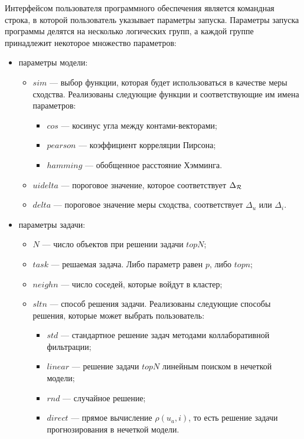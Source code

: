 Интерфейсом пользователя программного обеспечения является командная
строка, в которой пользователь указывает параметры запуска.
Параметры запуска программы делятся на несколько логических групп,
а каждой группе принадлежит некоторое множество параметров:

\begin{itemize}
	\item параметры модели:
	\begin{itemize}
		\item $sim$ --- выбор функции, которая будет использоваться в качестве
			меры сходства. Реализованы следующие функции и соответствующие им
			имена параметров:
			\begin{itemize}
				\item $cos$ --- косинус угла между контами-векторами;
				\item $pearson$ --- коэффициент корреляции Пирсона;
				\item $hamming$ --- обобщенное расстояние Хэмминга.
			\end{itemize}
		\item $uidelta$ --- пороговое значение, которое соответствует
			$\Delta_{\mathcal{R}}$
		\item $delta$ --- пороговое значение меры сходства, соответствует
			$\Delta_u$ или $\Delta_i$.
	\end{itemize}
	\item параметры задачи:
	\begin{itemize}
		\item $N$ --- число объектов при решении задачи $topN$;
		\item $task$ --- решаемая задача. Либо параметр равен $p$, либо $topn$;
		\item $neighn$ --- число соседей, которые войдут в кластер;
		\item $sltn$ --- способ решения задачи. Реализованы следующие способы
			решения, которые может выбрать пользователь:
			\begin{itemize}
				\item $std$ --- стандартное решение задач методами коллаборативной
					фильтрации;
				\item $linear$ --- решение задачи $topN$ линейным поиском в нечеткой
					модели;
				\item $rnd$ --- случайное решение;
				\item $direct$ --- прямое вычисление $\rho(u_a, i)$, то есть
					решение задачи прогнозирования в нечеткой модели.
			\end{itemize}

\end{itemize}
\end{itemize}

